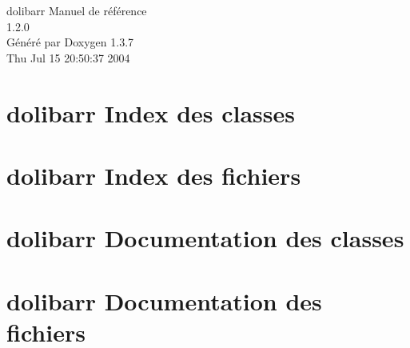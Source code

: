 \documentclass[a4paper]{book}
\begin{document}
\begin{titlepage}
\vspace*{7cm}
\begin{center}
{\Large dolibarr Manuel de r\'{e}f\'{e}rence\\[1ex]\large 1.2.0 }\\
\vspace*{1cm}
{\large G\'{e}n\'{e}r\'{e} par Doxygen 1.3.7}\\
\vspace*{0.5cm}
{\small Thu Jul 15 20:50:37 2004}\\
\end{center}
\end{titlepage}
\clearemptydoublepage
{}
\tableofcontents
\clearemptydoublepage
{}
\chapter{dolibarr Index des classes}

\chapter{dolibarr Index des fichiers}

\chapter{dolibarr Documentation des classes}

\chapter{dolibarr Documentation des fichiers}





\printindex
\end{document}
